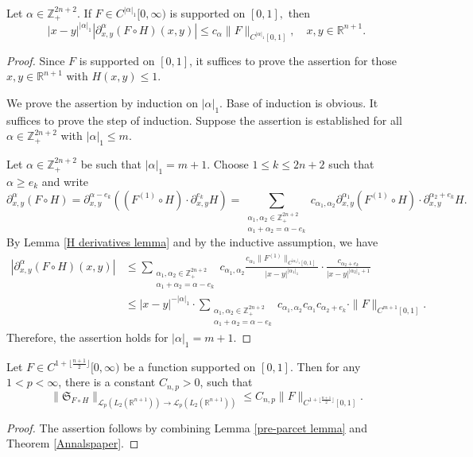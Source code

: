 \documentclass{amsart}
\begin{document}
\begin{lemma}\label{pre-parcet lemma} Let $\alpha\in\mathbb{Z}^{2n+2}_+.$ If $F\in C^{|\alpha|_1}[0,\infty)$ is supported on $[0,1],$ then
$$|x-y|^{|\alpha|_1}|\partial_{x,y}^{\alpha}(F\circ H)(x,y)|\leq c_{\alpha}\|F\|_{C^{|\alpha|_1}[0,1]},\quad x,y\in\mathbb{R}^{n+1}.$$
\end{lemma}
\begin{proof}
Since $F$ is supported on $[0,1]$, it suffices to prove the assertion for those $x,y\in\mathbb{R}^{n+1}$ with $H(x,y)\leq 1.$

We prove the assertion by induction on $|\alpha|_1.$ Base of induction is obvious. It suffices to prove the step of induction. Suppose the assertion is established for all $\alpha\in\mathbb{Z}^{2n+2}_+$ with $|\alpha|_1\leq m.$
	
Let $\alpha\in\mathbb{Z}^{2n+2}_+$ be such that $|\alpha|_1=m+1.$ Choose $1\leq k\leq 2n+2$ such that $\alpha\geq e_k$ and write
$$\partial_{x,y}^{\alpha}(F\circ H)=\partial_{x,y}^{\alpha-e_k}((F^{(1)}\circ H)\cdot \partial_{x,y}^{e_k}H)=\sum_{\substack{\alpha_1,\alpha_2\in\mathbb{Z}^{2n+2}_+\\ \alpha_1+\alpha_2=\alpha-e_k}}c_{\alpha_1,\alpha_2}\partial_{x,y}^{\alpha_1}(F^{(1)}\circ H)\cdot \partial_{x,y}^{\alpha_2+e_k}H.$$
By Lemma \ref{H derivatives lemma} and by the inductive assumption, we have
\begin{align*}
|\partial_{x,y}^{\alpha}(F\circ H)(x,y)|&\leq\sum_{\substack{\alpha_1,\alpha_2\in\mathbb{Z}^{2n+2}_+\\ \alpha_1+\alpha_2=\alpha-e_k}}c_{\alpha_1,\alpha_2}\frac{c_{\alpha_1}\|F^{(1)}\|_{C^{|\alpha_1|_1}[0,1]}}{|x-y|^{|\alpha_1|_1}}\cdot \frac{c_{\alpha_2+e_k}}{|x-y|^{|\alpha_2|_1+1}}\\
&\leq |x-y|^{-|\alpha|_1}\cdot \sum_{\substack{\alpha_1,\alpha_2\in\mathbb{Z}^{2n+2}_+\\ \alpha_1+\alpha_2=\alpha-e_k}}c_{\alpha_1,\alpha_2}c_{\alpha_1}c_{\alpha_2+e_k}\cdot \|F\|_{C^{m+1}[0,1]}.
\end{align*}
Therefore, the assertion holds for $|\alpha|_1=m+1$.
\end{proof}

\begin{lemma}\label{post-parcet lemma} Let $F\in C^{1+\lfloor\frac{n+1}{2}\rfloor}[0,\infty)$ be a function supported on $[0,1].$ Then for any $1<p<\infty$, there is a constant $C_{n,p}>0$, such that
$$\|\mathfrak{S}_{F\circ H}\|_{\mathcal{L}_p(L_2(\mathbb{R}^{n+1}))\to \mathcal{L}_p(L_2(\mathbb{R}^{n+1}))}\leq C_{n,p}\|F\|_{C^{1+\lfloor\frac{n+1}{2}\rfloor}[0,1]}.$$
\end{lemma}
\begin{proof} The assertion follows by combining Lemma \ref{pre-parcet lemma} and Theorem \ref{Annalspaper}.
\end{proof}
\end{document}
